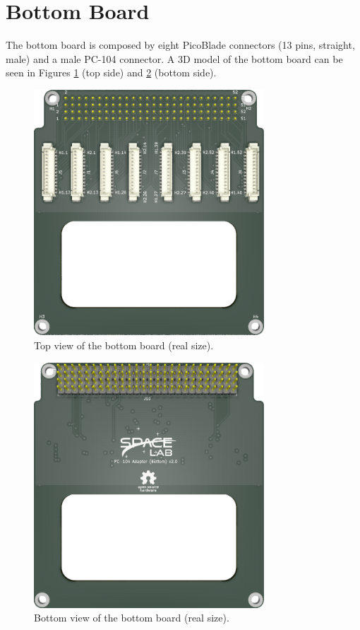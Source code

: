 \section{Bottom Board}

The bottom board is composed by eight PicoBlade connectors (13 pins, straight, male) and a male PC-104 connector. A 3D model of the bottom board can be seen in Figures \ref{fig:bottom-board-top} (top side) and \ref{fig:bottom-board-bottom} (bottom side).

\begin{figure}[!htb]
    \begin{center}
        \includegraphics[width=8.626cm]{figures/pc104-adapter-bottom-top}
        \caption{Top view of the bottom board (real size).}
        \label{fig:bottom-board-top}
    \end{center}
\end{figure}

\begin{figure}[!htb]
    \begin{center}
        \includegraphics[width=8.626cm]{figures/pc104-adapter-bottom-bottom}
        \caption{Bottom view of the bottom board (real size).}
        \label{fig:bottom-board-bottom}
    \end{center}
\end{figure}

